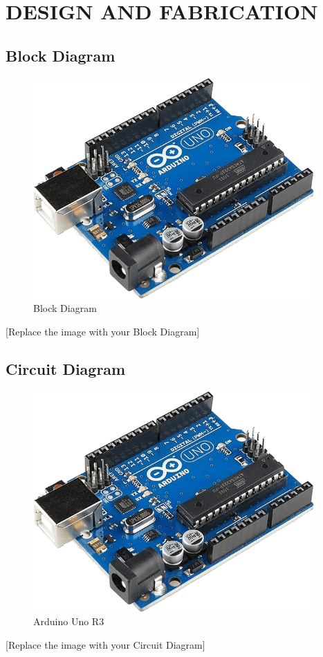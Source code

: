 
       \newpage
\chapter{DESIGN AND FABRICATION}


  

\begin{center}
    \section{Block Diagram}
\end{center}
\begin{figure}[H]
	\centering
	\includegraphics[width=10.75cm,height=8.44cm]{./figures/block_diagram.png}
        \caption{Block Diagram}
	\end{figure}
\begin{center}
    [Replace the image with your Block Diagram]
\end{center}
   
        \newpage
  \begin{center}
      \section{Circuit Diagram}
  \end{center}
  \begin{figure}[H]
	\centering
	\includegraphics[width=10.75cm,height=8.44cm]{./figures/circuit_diagram.png}
        \caption{Arduino Uno R3}
	\end{figure}
 \begin{center}
     [Replace the image with your Circuit Diagram]
 \end{center}

